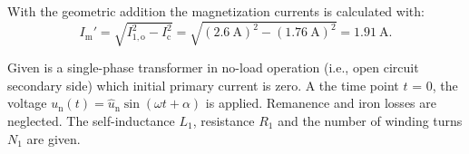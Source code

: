 \begin{solutionblock}
  With the geometric addition the magnetization currents is calculated with:
  \begin{equation}
    I_{\mathrm{m}}' = \sqrt{I_{\mathrm{1,o}}^2 - I_{\mathrm{c}}^2}
    = \sqrt{\left(\SI{2.6}{\ampere} \right)^2 - \left(\SI{1.76}{\ampere}\right)^2}
    = \SI{1.91}{\ampere}.
  \end{equation}

\end{solutionblock}








Given is a single-phase transformer in no-load operation (i.e., open circuit secondary side) which initial primary current is zero. A the time point $t$ = 0, the voltage $u_{\mathrm{n}}(t) = \hat{u}_{\mathrm{n}} \sin (\omega t + \alpha)$ is applied.
Remanence and iron losses are neglected.
The self-inductance $L_{\mathrm{1}}$, resistance $R_{\mathrm{1}}$ and the number of winding turns $N_{\mathrm{1}}$ are given.


